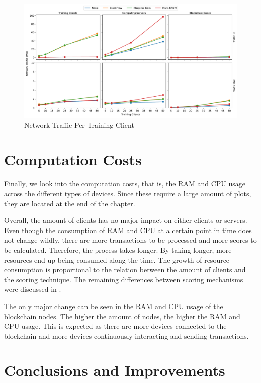 \begin{figure}[!ht]
    \centering
    \includegraphics[width=\textwidth]{graphics/clients/traffic.pdf}
    \caption{Network Traffic Per Training Client}
    \label{fig:net_clients}
\end{figure}


\section{Computation Costs}

Finally, we look into the computation costs, that is, the RAM and CPU usage across the different types of devices. Since these require a large amount of plots, they are located at the end of the chapter.

Overall, the amount of clients has no major impact on either clients or servers. Even though the consumption of RAM and CPU at a certain point in time does not change wildly, there are more transactions to be processed and more scores to be calculated. Therefore, the process takes longer. By taking longer, more resources end up being consumed along the time. The growth of resource consumption is proportional to the relation between the amount of clients and the scoring technique. The remaining differences between scoring mechanisms were discussed in .

The only major change can be seen in the RAM and CPU usage of the blockchain nodes. The higher the amount of nodes, the higher the RAM and CPU usage. This is expected as there are more devices connected to the blockchain and more devices continuously interacting and sending transactions.

\section{Conclusions and Improvements}

